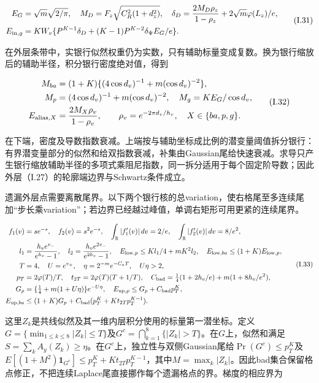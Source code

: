 \documentclass[11pt,a4paper]{article}
\begin{document}
\[
\begin{aligned}
E_G&=\sqrt m\sqrt{2/\pi},\quad
M_D=F_z\sqrt{C_R^2(1+d_z^2)},\quad
\delta_D=\frac{2M_D\rho_z}{1-\rho_z}+2\sqrt m\varphi(L_z)/e,\\
E_{{\rm in},g}&=KW_v\{P^{K-1}\delta_D+(K-1)P^{K-2}\delta_\Psi E_G/e\}.
\end{aligned}
\tag{I.31}
\]

在外层条带中，实银行似然权重仍为实数，只有辅助标量变成复数。换为银行缩放后的辅助半径，积分银行密度绝对值，得到

\[
\begin{aligned}
M_{ba}&=(1+K)\{(4\cos d_v)^{-1}+m(\cos d_v)^{-2}\},\\
M_p&=(4\cos d_v)^{-1}+m(\cos d_v)^{-2},\quad M_g=KE_G/\cos d_v,\\
E_{{\rm alias},X}&=\frac{2M_X\rho_v}{1-\rho_v},\qquad
\rho_v=e^{-2\pi d_v/h_v},\quad X\in\{ba,p,g\}.
\end{aligned}
\tag{I.32}
\]

在下端，密度及导数指数衰减。上端按与辅助坐标成比例的潜变量阈值拆分银行：有界潜变量部分的似然和给双指数衰减，补集由Gaussian尾给快速衰减。求导只产生银行缩放辅助半径的多项式乘阻尼指数，同一拆分适用于每个固定阶导数；因此外层（I.27）的轮廓端边界与Schwartz条件成立。

遗漏外层点需要离散尾界。以下两个银行核的总variation，使右格尾至多连续尾加``步长乘variation''；若边界已经越过峰值，单调右矩形可用更紧的连续尾界。

\[
\begin{aligned}
f_1(v)&=se^{-s},\quad f_2(v)=s^2e^{-s},\quad
\int_{\mathbb R}|f_1'(v)|\,dv=2/e,\quad\int_{\mathbb R}|f_2'(v)|\,dv=8/e^2,\\
l_1&=\frac{h_ve^{v_-}}{e^{h_v}-1},\quad l_2=\frac{h_ve^{2v_-}}{e^{2h_v}-1},\quad
E_{{\rm low},p}\le Kl_1/4+mK^2l_2,\quad E_{{\rm low},ba}\le(1+K)E_{{\rm low},p},\\
T&=4,\quad U=e^{v_+},\quad\eta=2^{-m}e^{-C_aT},\quad U\eta>2,\\
p_T&=2\varphi(T)/T,\quad t_{2T}=2\varphi(T)(T+1/T),\quad
C_{\rm bad}=\tfrac14(1+2h_v/e)+m(1+8h_v/e^2),\\
G_p&=\{\tfrac14+m(1+U\eta)\}e^{-U\eta},\quad
E_{{\rm up},p}\le G_p+C_{\rm bad}p_T^K,\\
E_{{\rm up},ba}&\le(1+K)G_p+C_{\rm bad}(p_T^K+Kt_{2T}p_T^{K-1}).
\end{aligned}
\tag{I.33}
\]

这里\(Z_k\)是共线似然及其一维内层积分使用的标量第一潜坐标。定义\(G=\{\min_{1\le k\le8}|Z_k|\le T\}\)及\(G^c=\bigcap_{k=1}^8\{|Z_k|>T\}\)。在\(G\)上，似然和满足\(S=\sum_k A_y(Z_k)\ge\eta\)。在\(G^c\)上，独立性与双侧Gaussian尾给\(\Pr(G^c)\le p_T^K\)及\(E[(1+M^2)\mathbf1_{G^c}]\le p_T^K+Kt_{2T}p_T^{K-1}\)，其中\(M=\max_k|Z_k|\)。因此bad集合保留格点修正，不把连续Laplace尾直接挪作每个遗漏格点的界。梯度的相应界为
\end{document}
